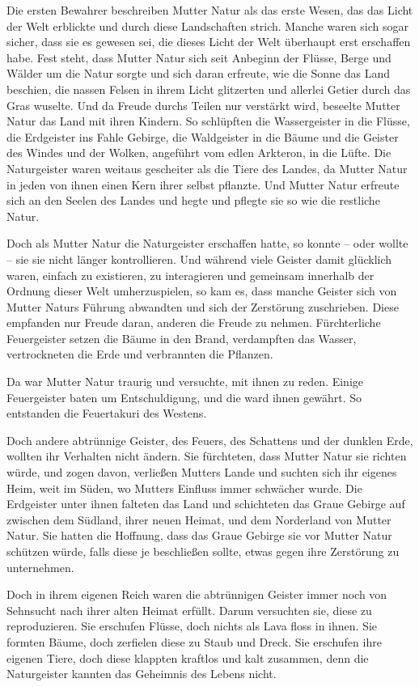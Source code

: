 \documentclass[10pt, a4paper, oneside]{book}
\begin{document}
Die ersten Bewahrer beschreiben Mutter Natur als das erste Wesen, das das Licht der Welt erblickte und durch diese Landschaften strich. Manche waren sich sogar sicher, dass sie es gewesen sei, die dieses Licht der Welt überhaupt erst erschaffen habe. Fest steht, dass Mutter Natur sich seit Anbeginn der Flüsse, Berge und Wälder um die Natur sorgte und sich daran erfreute, wie die Sonne das Land beschien, die nassen Felsen in ihrem Licht glitzerten und allerlei Getier durch das Gras wuselte. Und da Freude durchs Teilen nur verstärkt wird, beseelte Mutter Natur das Land mit ihren Kindern. So schlüpften die Wassergeister in die Flüsse, die Erdgeister ins Fahle Gebirge, die Waldgeister in die Bäume und die Geister des Windes und der Wolken, angeführt vom edlen Arkteron, in die Lüfte. Die Naturgeister waren weitaus gescheiter als die Tiere des Landes, da Mutter Natur in jeden von ihnen einen Kern ihrer selbst pflanzte. Und Mutter Natur erfreute sich an den Seelen des Landes und hegte und pflegte sie so wie die restliche Natur.

Doch als Mutter Natur die Naturgeister erschaffen hatte, so konnte – oder wollte – sie sie nicht länger kontrollieren. Und während viele Geister damit glücklich waren, einfach zu existieren, zu interagieren und gemeinsam innerhalb der Ordnung dieser Welt umherzuspielen, so kam es, dass manche Geister sich von Mutter Naturs Führung abwandten und sich der Zerstörung zuschrieben. Diese empfanden nur Freude daran, anderen die Freude zu nehmen. Fürchterliche Feuergeister setzen die Bäume in den Brand, verdampften das Wasser, vertrockneten die Erde und verbrannten die Pflanzen.

Da war Mutter Natur traurig und versuchte, mit ihnen zu reden. Einige Feuergeister baten um Entschuldigung, und die ward ihnen gewährt. So entstanden die Feuertakuri des Westens.

Doch andere abtrünnige Geister, des Feuers, des Schattens und der dunklen Erde, wollten ihr Verhalten nicht ändern. Sie fürchteten, dass Mutter Natur sie richten würde, und zogen davon, verließen Mutters Lande und suchten sich ihr eigenes Heim, weit im Süden, wo Mutters Einfluss immer schwächer wurde. Die Erdgeister unter ihnen falteten das Land und schichteten das Graue Gebirge auf zwischen dem Südland, ihrer neuen Heimat, und dem Norderland von Mutter Natur. Sie hatten die Hoffnung, dass das Graue Gebirge sie vor Mutter Natur schützen würde, falls diese je beschließen sollte, etwas gegen ihre Zerstörung zu unternehmen.

Doch in ihrem eigenen Reich waren die abtrünnigen Geister immer noch von Sehnsucht nach ihrer alten Heimat erfüllt. Darum versuchten sie, diese zu reproduzieren. Sie erschufen Flüsse, doch nichts als Lava floss in ihnen. Sie formten Bäume, doch zerfielen diese zu Staub und Dreck. Sie erschufen ihre eigenen Tiere, doch diese klappten kraftlos und kalt zusammen, denn die Naturgeister kannten das Geheimnis des Lebens nicht.
\end{document}
